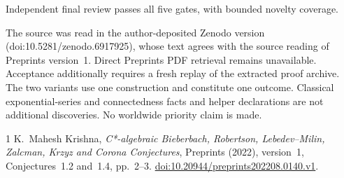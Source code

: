 \documentclass[11pt]{article}
\begin{document}
Independent final review passes all five gates, with bounded novelty coverage.

The source was read in the author-deposited Zenodo version
(doi:10.5281/zenodo.6917925), whose text agrees with the source reading of
Preprints version~1. Direct Preprints PDF retrieval remains unavailable.
Acceptance additionally requires a fresh replay of the extracted proof
archive. The two variants use one construction and constitute one outcome. Classical
exponential-series and connectedness facts and helper declarations are not
additional discoveries. No worldwide priority claim is made.

\begin{thebibliography}{1}
 K.~Mahesh Krishna,
\emph{C*-algebraic Bieberbach, Robertson, Lebedev--Milin, Zalcman, Krzyz and
Corona Conjectures}, Preprints (2022), version~1,
Conjectures~1.2 and~1.4, pp.~2--3.
\href{https://doi.org/10.20944/preprints202208.0140.v1}{doi:10.20944/preprints202208.0140.v1}.
\end{thebibliography}
\end{document}
